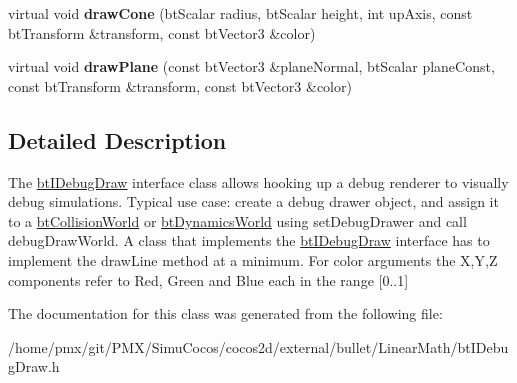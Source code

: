 \begin{DoxyCompactItemize}
\item 
\mbox{\label{classbtIDebugDraw_a0059af5b0a43dd6b2d464f94938d4d14}} 
virtual void {\bfseries draw\+Cone} (bt\+Scalar radius, bt\+Scalar height, int up\+Axis, const bt\+Transform \&transform, const bt\+Vector3 \&color)
\item 
\mbox{\label{classbtIDebugDraw_a012926f8d101863d8d9d1af6f2fca0a0}} 
virtual void {\bfseries draw\+Plane} (const bt\+Vector3 \&plane\+Normal, bt\+Scalar plane\+Const, const bt\+Transform \&transform, const bt\+Vector3 \&color)
\end{DoxyCompactItemize}


\subsection{Detailed Description}
The \hyperlink{classbtIDebugDraw}{bt\+I\+Debug\+Draw} interface class allows hooking up a debug renderer to visually debug simulations. Typical use case\+: create a debug drawer object, and assign it to a \hyperlink{classbtCollisionWorld}{bt\+Collision\+World} or \hyperlink{classbtDynamicsWorld}{bt\+Dynamics\+World} using set\+Debug\+Drawer and call debug\+Draw\+World. A class that implements the \hyperlink{classbtIDebugDraw}{bt\+I\+Debug\+Draw} interface has to implement the draw\+Line method at a minimum. For color arguments the X,Y,Z components refer to Red, Green and Blue each in the range \mbox{[}0..1\mbox{]} 

The documentation for this class was generated from the following file\+:\begin{DoxyCompactItemize}
\item 
/home/pmx/git/\+P\+M\+X/\+Simu\+Cocos/cocos2d/external/bullet/\+Linear\+Math/bt\+I\+Debug\+Draw.\+h\end{DoxyCompactItemize}

